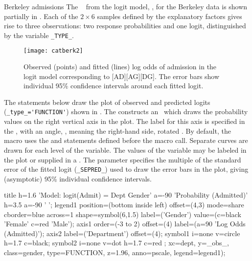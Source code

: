 \begin{Example}[berkeley8]{Berkeley admissions}
The \ODS\  from the logit model, ,
for the Berkeley data is shown partially in .
Each of the $ 2 \times 6$ samples defined by the explanatory factors
gives rise to three observations: two response probabilities and
one logit, distinguished by the variable \verb|_TYPE_|.
\begin{Output}[htb]
\caption{Output \Dset\  from the logit model for Berkeley admissions (partial)}\label{out:catberk2.2}
\small

\end{Output}

\begin{figure}[htb]
  \centering
  \texttt{[image: catberk2]}
  \caption[Observed and fitted log odds of admission in the logit model]{Observed (points) and fitted (lines) log odds of admission in the logit model
  corresponding to [AD][AG][DG].  The error bars show individual 95\%
  confidence intervals around each fitted logit.}%
  \label{fig:catberk2}
\end{figure}

The statements below draw the plot of observed and predicted logits
(\verb|_type_='FUNCTION'|) shown in .
The  constructs an \ADS\
which draws the probability values on the right vertical axis in the
plot.
The label for this axis is specified in the , with
an angle, \pname{A=-90}, meaning the right-hand side, rotated .
By default, the macro uses the \pname{AXIS} and \pname{SYMBOL}
statements defined before the macro call.
Separate curves are
drawn for each level of the  variable.
The values of the  variable may be labeled in the plot
or supplied in a \stmt{LEGEND}{CATPLOT}.
The parameter  specifies the multiple of
the standard error of the fitted logit (\verb|_SEPRED_|) used to
draw the error bars in the plot,
giving (asymptotic) 95\% individual confidence intervals.
\begin{listing}

title h=1.6 'Model:  logit(Admit) = Dept Gender'
            a=-90 'Probability (Admitted)'
      h=3.5 a=-90 ' ';
legend1 position=(bottom inside left)  offset=(4,3)
        mode=share cborder=blue across=1
        shape=symbol(6,1.5) label=('Gender')
        value=(c=black 'Female'
               c=red   'Male');
axis1 order=(-3 to 2) offset=(4)
      label=(a=90 'Log Odds (Admitted)');
axis2 label=('Department') offset=(4);
symbol1 i=none v=circle h=1.7 c=black;
symbol2 i=none v=dot    h=1.7 c=red  ;
   xc=dept, y=_obs_, class=gender,
   type=FUNCTION,
   z=1.96, anno=pscale, legend=legend1);
\end{listing}


\end{Example}
